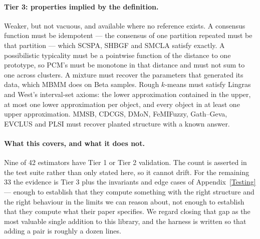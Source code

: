\documentclass[twoside,11pt]{article}
\begin{document}
\paragraph{Tier 3: properties implied by the definition.}
Weaker, but not vacuous, and available where no reference exists. A consensus
function must be idempotent --- the consensus of one partition repeated must
be that partition --- which SCSPA, SHBGF and SMCLA satisfy exactly. A
possibilistic typicality must be a pointwise function of the distance to one
prototype, so PCM's must be monotone in that distance and must not sum to one
across clusters. A mixture must recover the parameters that generated its
data, which MBMM does on Beta samples. Rough $k$-means must satisfy Lingras
and West's interval-set axioms: the lower approximation contained in the
upper, at most one lower approximation per object, and every object in at
least one upper approximation. MMSB, CDCGS, DMoN, FeMIFuzzy, Gath--Geva,
EVCLUS and PLSI must recover planted structure with a known answer.

\paragraph{What this covers, and what it does not.}
Nine of 42 estimators have Tier 1 or Tier 2 validation. The count is asserted
in the test suite rather than only stated here, so it cannot drift. For the
remaining 33 the evidence is Tier 3 plus the invariants and edge cases of
Appendix~\ref{Testing} --- enough to establish that they compute something
with the right structure and the right behaviour in the limits we can reason
about, not enough to establish that they compute what their paper specifies.
We regard closing that gap as the most valuable single addition to this
library, and the harness is written so that adding a pair is roughly a dozen
lines.
\end{document}
